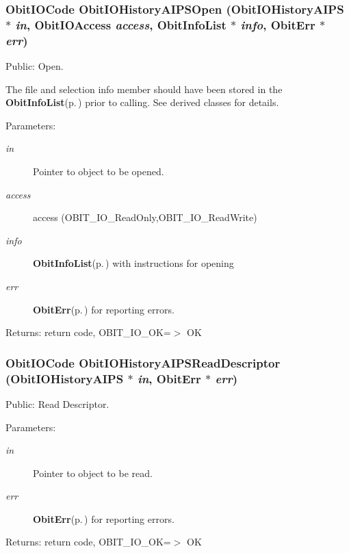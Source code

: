 \subsubsection{\setlength{\rightskip}{0pt plus 5cm}Obit\-IOCode Obit\-IOHistory\-AIPSOpen ({\bf Obit\-IOHistory\-AIPS} $\ast$ {\em in}, Obit\-IOAccess {\em access}, {\bf Obit\-Info\-List} $\ast$ {\em info}, {\bf Obit\-Err} $\ast$ {\em err})}\label{ObitIOHistoryAIPS_8c_a15}


Public: Open. 

The file and selection info member should have been stored in the {\bf Obit\-Info\-List}{\rm (p.\,\pageref{structObitInfoList})} prior to calling. See derived classes for details. \begin{Desc}
\item[Parameters:]
\begin{description}
\item[{\em in}]Pointer to object to be opened. \item[{\em access}]access (OBIT\_\-IO\_\-Read\-Only,OBIT\_\-IO\_\-Read\-Write) \item[{\em info}]{\bf Obit\-Info\-List}{\rm (p.\,\pageref{structObitInfoList})} with instructions for opening \item[{\em err}]{\bf Obit\-Err}{\rm (p.\,\pageref{structObitErr})} for reporting errors. \end{description}
\end{Desc}
\begin{Desc}
\item[Returns:]return code, OBIT\_\-IO\_\-OK=$>$ OK \end{Desc}
\subsubsection{\setlength{\rightskip}{0pt plus 5cm}Obit\-IOCode Obit\-IOHistory\-AIPSRead\-Descriptor ({\bf Obit\-IOHistory\-AIPS} $\ast$ {\em in}, {\bf Obit\-Err} $\ast$ {\em err})}\label{ObitIOHistoryAIPS_8c_a21}


Public: Read Descriptor. 

\begin{Desc}
\item[Parameters:]
\begin{description}
\item[{\em in}]Pointer to object to be read. \item[{\em err}]{\bf Obit\-Err}{\rm (p.\,\pageref{structObitErr})} for reporting errors. \end{description}
\end{Desc}
\begin{Desc}
\item[Returns:]return code, OBIT\_\-IO\_\-OK=$>$ OK \end{Desc}
